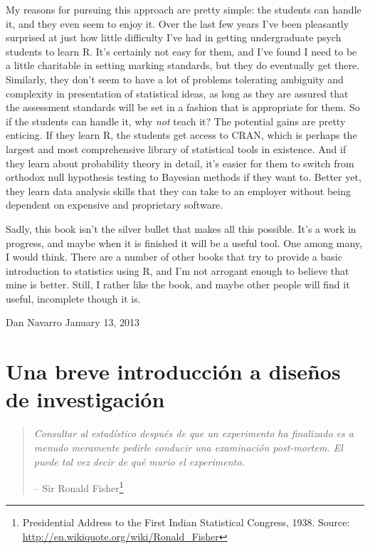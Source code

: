 \documentclass[]{book}
\begin{document}
My reasons for pursuing this approach are pretty simple: the students can handle it, and they even seem to enjoy it. Over the last few years I've been pleasantly surprised at just how little difficulty I've had in getting undergraduate psych students to learn R. It's certainly not easy for them, and I've found I need to be a little charitable in setting marking standards, but they do eventually get there. Similarly, they don't seem to have a lot of problems tolerating ambiguity and complexity in presentation of statistical ideas,
as long as they are assured that the assessment standards will be set in a fashion that is appropriate for them. So if the students can handle it, why \emph{not} teach it? The potential gains are pretty enticing. If they learn R, the students get access to CRAN, which is perhaps the largest and most comprehensive library of statistical tools in existence. And if they learn about probability theory in detail, it's easier for them to switch from orthodox null hypothesis testing to Bayesian methods if they want to. Better yet, they learn data analysis skills that they can take to an employer without being dependent on expensive and proprietary software.

Sadly, this book isn't the silver bullet that makes all this possible. It's a work in progress, and maybe when it is finished it will be a useful tool. One among many, I would think. There are a number of other books that try to provide a basic introduction to statistics using R, and I'm not arrogant enough to believe that mine is better. Still, I rather like the book, and maybe other people will find it useful, incomplete though it is.

Dan Navarro
January 13, 2013

\hypertarget{studydesign}{%
\chapter{Una breve introducción a diseños de investigación}\label{studydesign}}

\begin{quote}
\emph{Consultar al estadístico después de que un experimento ha finalizado es a menudo
meramente pedirle conducir una examinación post-mortem. El puede tal vez decir
de qué murio el experimento.}

-- Sir Ronald Fisher\footnote{Presidential Address to the First Indian Statistical Congress, 1938. Source: \url{http://en.wikiquote.org/wiki/Ronald_Fisher}}
\end{quote}
\end{document}
